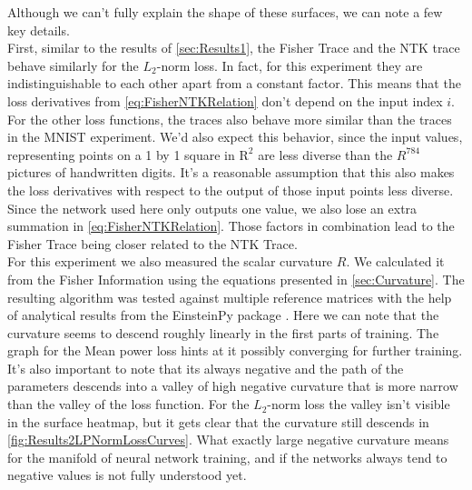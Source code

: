 Although we can't fully explain the shape of these surfaces, we can note a few key details.\\
First, similar to the results of \cref{sec:Results1}, the Fisher Trace and the NTK trace behave similarly for the $L_2$-norm loss. In fact, for this experiment they are indistinguishable to each other apart from a constant factor. This means that the loss derivatives from \cref{eq:FisherNTKRelation} don't depend on the input index $i$. For the other loss functions, the traces also behave more similar than the traces in the MNIST experiment. We'd also expect this behavior, since the input values, representing points on a 1 by 1 square in $\mathrm{R}^2$ are less diverse than the $R^{784}$ pictures of handwritten digits. It's a reasonable assumption that this also makes the loss derivatives with respect to the output of those input points less diverse. Since the network used here only outputs one value, we also lose an extra summation in \cref{eq:FisherNTKRelation}. Those factors in combination lead to the Fisher Trace being closer related to the NTK Trace.\\
For this experiment we also measured the scalar curvature $R$. We calculated it from the Fisher Information using the equations presented in \cref{sec:Curvature}. The resulting algorithm was tested against multiple reference matrices with the help of analytical results from the EinsteinPy package \cite{EinsteinPyPackage}. Here we can note that the curvature seems to descend roughly linearly in the first parts of training. The graph for the Mean power loss hints at it possibly converging for further training. It's also important to note that its always negative and the path of the parameters descends into a valley of high negative curvature that is more narrow than the valley of the loss function. For the $L_2$-norm loss the valley isn't visible in the surface heatmap, but it gets clear that the curvature still descends in \cref{fig:Results2LPNormLossCurves}. What exactly large negative curvature means for the manifold of neural network training, and if the networks always tend to negative values is not fully understood yet.